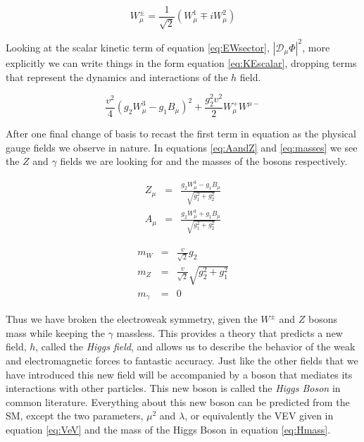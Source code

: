 \begin{equation}
\label{eq:Wpm}
W^{\pm}_{\mu}  =  \frac{1}{\sqrt{2}}\left(W_{\mu}^{1} \mp i W_{\mu}^{2}\right)
\end{equation}

Looking at the scalar kinetic term of equation \ref{eq:EWsector}, $\left|\mathcal{D}_{\mu}\Phi\right|^{2}$, more explicitly we can write things in the form equation \ref{eq:KEscalar}, dropping terms that represent the dynamics and interactions of the $h$ field.

\begin{equation}
\label{eq:KEscalar} 
\frac{v^2}{4}\left(g_{2}W_{\mu}^{3} - g_{1}B_{\mu}\right)^2 + \frac{g_{2}^{2}v^{2}}{2}W_{\mu}^{+}W^{\mu -}
\end{equation}

After one final change of basis to recast the first term in equation \label{eq:KEscalar} as the physical gauge fields we observe in nature. In equations \ref{eq:AandZ} and \ref{eq:masses} we see the $Z$ and $\gamma$ fields we are looking for and the masses of the bosons respectively. 

\begin{eqnarray}
\label{eq:AandZ}
Z_{\mu}  &=&  \frac{g_{2}W^{3}_{\mu} - g_{1}B_{\mu}}{\sqrt{g_{1}^{2}+g_{2}^{2}}} \nonumber \\
A_{\mu}  &=&  \frac{g_{2}W^{3}_{\mu} + g_{1}B_{\mu}}{\sqrt{g_{1}^{2}+g_{2}^{2}}}
\end{eqnarray}

\begin{eqnarray}
\label{eq:masses}
m_{W} & = & \frac{v}{\sqrt{2}}g_{2} \nonumber \\
m_{Z} & = & \frac{v}{\sqrt{2}}\sqrt{g_{2}^{2} + g_{1}^{2}} \\
m_{\gamma} & = & 0 \nonumber 
\end{eqnarray}

Thus we have broken the electroweak symmetry, given the $W^{\pm}$ and $Z$ bosons mass while keeping the $\gamma$ massless. This provides a theory that predicts a new field, $h$, called the \textit{Higgs field}, and allows us to describe the behavior of the weak and electromagnetic forces to fantastic accuracy. Just like the other fields that we have introduced this new field will be accompanied by a boson that mediates its interactions with other particles. This new boson is called the \textit{Higgs Boson} in common literature. Everything about this new boson can be predicted from the SM, except the two parameters, $\mu^{2}$ and $\lambda$, or equivalently the VEV given in equation \ref{eq:VeV} and the mass of the Higgs Boson in equation \ref{eq:Hmass}.

